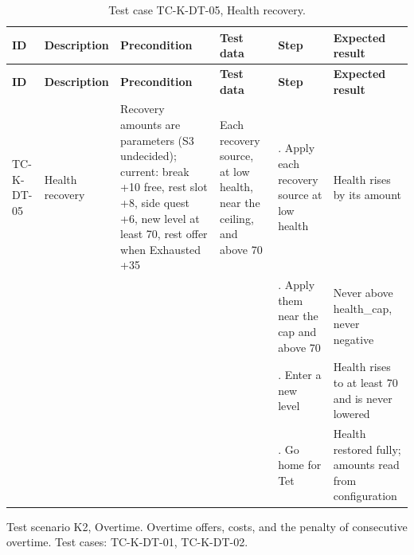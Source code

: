 {\footnotesize{}\renewcommand{\arraystretch}{1.1}
\begin{longtable}{|>{\raggedright\arraybackslash}p{}|>{\raggedright\arraybackslash}p{}|>{\raggedright\arraybackslash}p{}|>{\raggedright\arraybackslash}p{}|>{\raggedright\arraybackslash}p{}|>{\raggedright\arraybackslash}p{}|}
\caption{Test case TC-K-DT-05, Health recovery.} \\
\hline
\textbf{ID} & \textbf{Description} & \textbf{Precondition} & \textbf{Test data} & \textbf{Step} & \textbf{Expected result} \\ \hline
\endfirsthead
\hline
\textbf{ID} & \textbf{Description} & \textbf{Precondition} & \textbf{Test data} & \textbf{Step} & \textbf{Expected result} \\ \hline
\endhead
TC-K-DT-05 & Health recovery & Recovery amounts are parameters (S3 undecided); current: break +10 free, rest slot +8, side quest +6, new level at least 70, rest offer when Exhausted +35 & Each recovery source, at low health, near the ceiling, and above 70 & 1. Apply each recovery source at low health & Health rises by its amount \\ \cline{5-6}
 &  &  &  & 2. Apply them near the cap and above 70 & Never above health\_cap, never negative \\ \cline{5-6}
 &  &  &  & 3. Enter a new level & Health rises to at least 70 and is never lowered \\ \cline{5-6}
 &  &  &  & 4. Go home for Tet & Health restored fully; amounts read from configuration \\ \hline
\end{longtable}
}

Test scenario K2, Overtime. Overtime offers, costs, and the penalty of consecutive overtime. Test cases: TC-K-DT-01, TC-K-DT-02.


